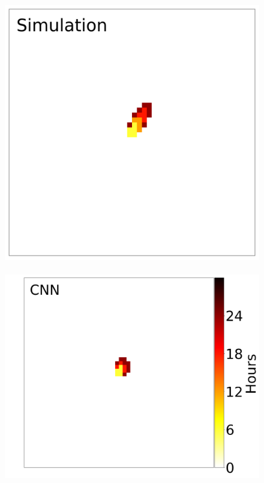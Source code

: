 \documentclass[smallcondensed]{svjour3}     %
\begin{document}
\begin{figure}[htbp]
	\\
	\includegraphics[height=0.16\textheight]{timeAnalysis_simulation3.png}
	~
	\includegraphics[height=0.16\textheight]{timeAnalysis_network3.png}
	~

\end{figure}
\end{document}
